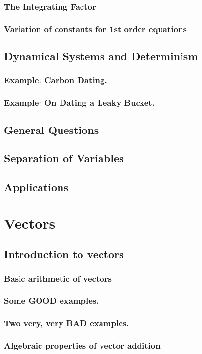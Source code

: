 \subsection{The Integrating Factor}
\subsection{Variation of constants for 1st order equations}
\section{Dynamical Systems and Determinism}
\subsection{Example: Carbon Dating. }
\subsection{Example: On Dating a Leaky Bucket. }
\section{General Questions}
\section{Separation of Variables}
\section{Applications}
\chapter{Vectors}
\section{Introduction to vectors}
\subsection{Basic arithmetic of vectors}
\subsection{Some GOOD examples. }
\subsection{Two very, very BAD examples. }
\subsection{Algebraic properties of vector addition}
